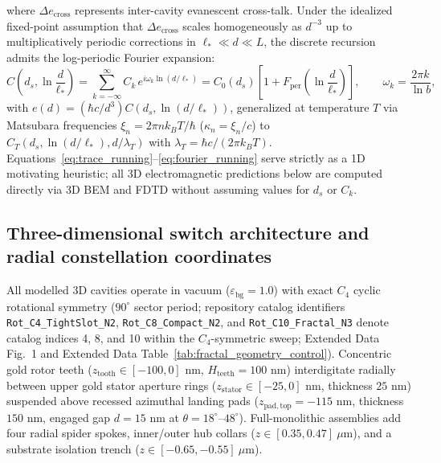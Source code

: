 \documentclass[11pt, a4paper]{article}
\begin{document}
where $\Delta e_{\mathrm{cross}}$ represents inter-cavity evanescent cross-talk. Under the idealized fixed-point assumption that $\Delta e_{\mathrm{cross}}$ scales homogeneously as $d^{-3}$ up to multiplicatively periodic corrections in $\ell_* \ll d \ll L$, the discrete recursion admits the log-periodic Fourier expansion:
\begin{equation}
C\!\left(d_s, \ln\frac{d}{\ell_*}\right) = \sum_{k=-\infty}^{\infty} C_k \, e^{i \omega_k \ln(d/\ell_*)} = C_0(d_s) \left[ 1 + F_{\mathrm{per}}\!\left(\ln\frac{d}{\ell_*}\right) \right], \qquad \omega_k = \frac{2\pi k}{\ln b},
\label{eq:fourier_running}
\end{equation}
with $e(d) = (\hbar c / d^3)C(d_s, \ln(d/\ell_*))$, generalized at temperature $T$ via Matsubara frequencies $\xi_n = 2\pi n k_B T/\hbar$ ($\kappa_n = \xi_n/c$) to $C_T(d_s, \ln(d/\ell_*), d/\lambda_T)$ with $\lambda_T = \hbar c/(2\pi k_B T)$\cite{gordon2026prd}. Equations~\eqref{eq:trace_running}--\eqref{eq:fourier_running} serve strictly as a 1D motivating heuristic; all 3D electromagnetic predictions below are computed directly via 3D BEM and FDTD without assuming values for $d_s$ or $C_k$.

\subsection*{Three-dimensional switch architecture and radial constellation coordinates}
All modelled 3D cavities operate in vacuum ($\varepsilon_{\mathrm{bg}}=1.0$) with exact $C_4$ cyclic rotational symmetry ($90^\circ$ sector period; repository catalog identifiers \texttt{Rot\_C4\_TightSlot\_N2}, \texttt{Rot\_C8\_Compact\_N2}, and \texttt{Rot\_C10\_Fractal\_N3} denote catalog indices 4, 8, and 10 within the $C_4$-symmetric sweep; Extended Data Fig.~1 and Extended Data Table~\ref{tab:fractal_geometry_control}). Concentric gold rotor teeth ($z_{\mathrm{tooth}} \in [-100, 0]\text{ nm}$, $H_{\mathrm{teeth}} = 100\text{ nm}$) interdigitate radially between upper gold stator aperture rings ($z_{\mathrm{stator}} \in [-25, 0]\text{ nm}$, thickness $25\text{ nm}$) suspended above recessed azimuthal landing pads ($z_{\mathrm{pad,top}} = -115\text{ nm}$, thickness $150\text{ nm}$, engaged gap $d = 15\text{ nm}$ at $\theta = 18^\circ\text{--}48^\circ$). Full-monolithic assemblies add four radial spider spokes, inner/outer hub collars ($z \in [0.35, 0.47]\ \mu\text{m}$), and a substrate isolation trench ($z \in [-0.65, -0.55]\ \mu\text{m}$).
\end{document}
